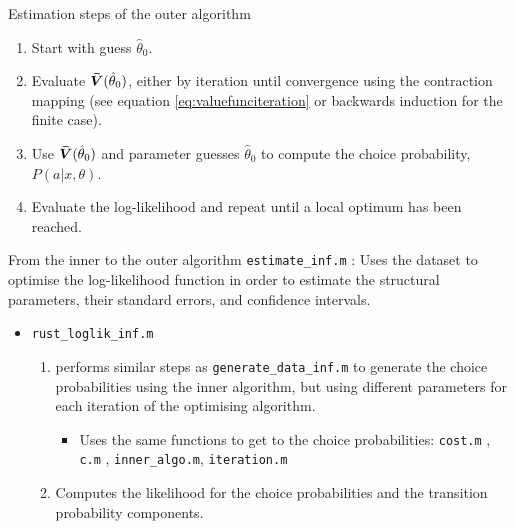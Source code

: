 \documentclass[aspectratio=169]{beamer}
\begin{document}
	
	\begin{frame}{Estimation steps of the outer algorithm}
		\begin{enumerate}
			\itemsep1em
			\item Start with guess $\hat{\theta}_0$.
			\item Evaluate $\bm{\Bar{V}}(\hat{\theta}_0)$, either by iteration until convergence using the contraction mapping (see equation \ref{eq:valuefunciteration} or backwards induction for the finite case).
			\item Use $\bm{\Bar{V}}(\hat{\theta}_0)$ and parameter guesses $\hat{\theta}_0$ to compute the choice probability, $P(a|x,\theta)$.
			\item Evaluate the log-likelihood and repeat until a local optimum has been reached.
		\end{enumerate}
		
	\end{frame}
	
	\begin{frame}{From the inner to the outer algorithm}
		\texttt{estimate\_inf.m} : Uses the dataset to optimise the log-likelihood function in order to estimate the structural parameters, their standard errors, and confidence intervals.
		
		\begin{itemize}
			\item 	\texttt{rust\_loglik\_inf.m} 
			\begin{enumerate}
				\itemsep1em
				\item performs similar steps as \texttt{generate\_data\_inf.m} to generate the choice probabilities using the inner algorithm, but using different parameters for each iteration of the optimising algorithm.
				\begin{itemize}
					\itemsep1em
					
					\item Uses the same functions to get to the choice probabilities: \texttt{cost.m} , \texttt{c.m} , \texttt{inner\_algo.m}, \texttt{iteration.m} 
				\end{itemize}
				\item Computes the likelihood for the choice probabilities and the transition probability components. 
			\end{enumerate}
			
		\end{itemize}
	\end{frame}
	
\end{document}
